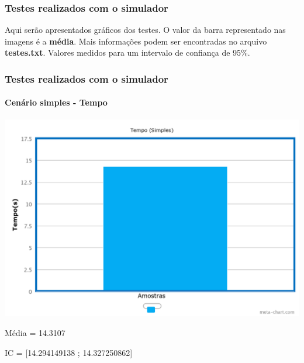 \documentclass{beamer}
\begin{document}
\begin{frame}
	\frametitle{Testes realizados com o simulador}
	Aqui serão apresentados gráficos dos testes. O valor da barra representado nas imagens é a \textbf{média}.
	Mais informações podem ser encontradas no arquivo \textbf{testes.txt}. Valores medidos para um intervalo de confiança de 95\%.
\end{frame}

\begin{frame}
	\frametitle{Testes realizados com o simulador}
	\framesubtitle{Cenário simples - Tempo}
	\begin{center}
	\includegraphics[scale=0.18]{chart.png}
	\end{center}
	\begin{center}
	Média = 14.3107
	\end{center}
	\begin{center}
	IC = [14.294149138 ; 14.327250862]
	\end{center}
\end{frame}
\end{document}
